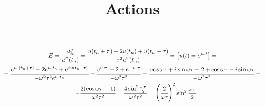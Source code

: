 \documentclass[a4paper,12pt]{article}
\title{Actions}
\author{ }
\date{ }
\begin{document}
\maketitle

\begin{multline*}
	E = \cfrac{u_{\overline{t}t}^n}{u^{''}(t_n)} = 
	\cfrac{u(t_n + \tau) - 2u(t_n) + u(t_n - \tau)}{\tau^2 u^{''}(t_n)} = 
	\left[u(t) = e^{i\omega t} \right] = \\
	= \cfrac{e^{i\omega (t_n + \tau)} - 2e^{i\omega t_n} + e^{i\omega (t_n - \tau)}}{-\omega^2\tau^2e^{i\omega t_n}}
	= \cfrac{e^{i\omega\tau} - 2 + e^{-i\omega\tau}}{-\omega^2\tau^2} = 
	\cfrac{\cos{\omega\tau} + i\sin{\omega\tau} - 2 + \cos{\omega\tau} - i\sin{\omega\tau}}{-\omega^2\tau^2} =
	\\
	= -\cfrac{2(\cos{\omega\tau} - 1)}{\omega^2\tau^2} = \cfrac{4\sin^2{\frac{\omega\tau}{2}}}{\omega^2\tau^2}
	= \left(\cfrac{2}{\omega\tau}\right)^2\sin^2{\cfrac{\omega\tau}{2}}
\end{multline*}
\end{document}
